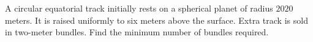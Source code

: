 A circular equatorial track initially rests on a spherical planet of radius $2020$ meters. It is raised uniformly to six meters above the surface. Extra track is sold in two-meter bundles. Find the minimum number of bundles required.

